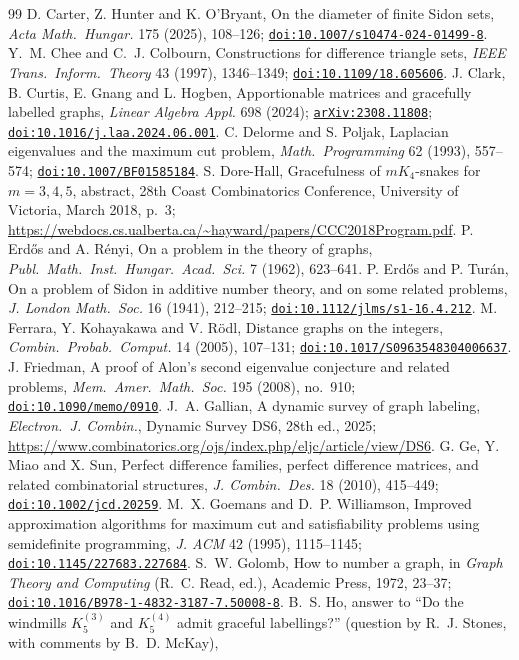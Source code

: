\documentclass[11pt]{amsart}
\theoremstyle{tplain}
\theoremstyle{tdefinition}
\theoremstyle{tremark}
\newcommand{\doi}[1]{\href{https://doi.org/#1}{\nolinkurl{doi:#1}}}
\newcommand{\arxiv}[1]{\href{https://arxiv.org/abs/#1}{\nolinkurl{arXiv:#1}}}
\begin{document}
\begin{thebibliography}{99}
D. Carter, Z. Hunter and K. O'Bryant, On the diameter of finite Sidon sets,
\emph{Acta Math.\ Hungar.} 175 (2025), 108--126; \doi{10.1007/s10474-024-01499-8}.
Y.~M. Chee and C.~J. Colbourn, Constructions for difference triangle sets,
\emph{IEEE Trans.\ Inform.\ Theory} 43 (1997), 1346--1349; \doi{10.1109/18.605606}.
J. Clark, B. Curtis, E. Gnang and L. Hogben, Apportionable matrices and
gracefully labelled graphs, \emph{Linear Algebra Appl.} 698 (2024);
\arxiv{2308.11808}; \doi{10.1016/j.laa.2024.06.001}.
C. Delorme and S. Poljak, Laplacian eigenvalues and the maximum cut problem,
\emph{Math.\ Programming} 62 (1993), 557--574; \doi{10.1007/BF01585184}.
S. Dore-Hall, Gracefulness of $mK_4$-snakes for $m=3,4,5$, abstract, 28th
Coast Combinatorics Conference, University of Victoria, March 2018, p.~3;
\url{https://webdocs.cs.ualberta.ca/~hayward/papers/CCC2018Program.pdf}.
P. Erd\H{o}s and A. R\'enyi, On a problem in the theory of graphs,
\emph{Publ.\ Math.\ Inst.\ Hungar.\ Acad.\ Sci.} 7 (1962), 623--641.
P. Erd\H{o}s and P. Tur\'an, On a problem of Sidon in additive number theory,
and on some related problems, \emph{J. London Math.\ Soc.} 16 (1941),
212--215; \doi{10.1112/jlms/s1-16.4.212}.
M. Ferrara, Y. Kohayakawa and V. R\"odl, Distance graphs on the integers,
\emph{Combin.\ Probab.\ Comput.} 14 (2005), 107--131; \doi{10.1017/S0963548304006637}.
J. Friedman, A proof of Alon's second eigenvalue conjecture and related
problems, \emph{Mem.\ Amer.\ Math.\ Soc.} 195 (2008), no.~910; \doi{10.1090/memo/0910}.
J.~A. Gallian, A dynamic survey of graph labeling,
\emph{Electron.\ J. Combin.}, Dynamic Survey DS6, 28th ed., 2025; \url{https://www.combinatorics.org/ojs/index.php/eljc/article/view/DS6}.
G. Ge, Y. Miao and X. Sun, Perfect difference families, perfect difference
matrices, and related combinatorial structures, \emph{J. Combin.\ Des.} 18
(2010), 415--449; \doi{10.1002/jcd.20259}.
M.~X. Goemans and D.~P. Williamson, Improved approximation algorithms for
maximum cut and satisfiability problems using semidefinite programming,
\emph{J. ACM} 42 (1995), 1115--1145; \doi{10.1145/227683.227684}.
S.~W. Golomb, How to number a graph, in \emph{Graph Theory and Computing}
(R.~C. Read, ed.), Academic Press, 1972, 23--37; \doi{10.1016/B978-1-4832-3187-7.50008-8}.
B.~S. Ho, answer to ``Do the windmills $K_5^{(3)}$ and $K_5^{(4)}$ admit graceful
labellings?'' (question by R.~J. Stones, with comments by B.~D. McKay),

\end{thebibliography}
\end{document}
